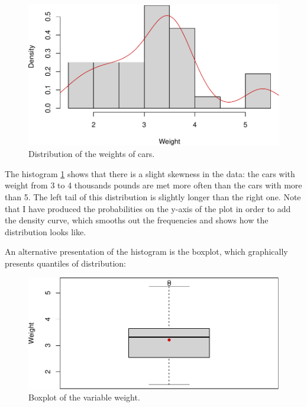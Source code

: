 \documentclass[
]{book}
\newenvironment{Shaded}{\begin{snugshade}}{\end{snugshade}}
\newcommand{\AttributeTok}[1]{\textcolor[rgb]{0.13,0.29,0.53}{#1}}
\newcommand{\DecValTok}[1]{\textcolor[rgb]{0.00,0.00,0.81}{#1}}
\newcommand{\FunctionTok}[1]{\textcolor[rgb]{0.13,0.29,0.53}{\textbf{#1}}}
\newcommand{\NormalTok}[1]{#1}
\newcommand{\SpecialCharTok}[1]{\textcolor[rgb]{0.81,0.36,0.00}{\textbf{#1}}}
\newcommand{\StringTok}[1]{\textcolor[rgb]{0.31,0.60,0.02}{#1}}
\theoremstyle{definition}
\theoremstyle{definition}
\theoremstyle{definition}
\theoremstyle{definition}
\theoremstyle{remark}
\begin{document}
\begin{figure}
\centering
\includegraphics{Svetunkov---Statistics-for-Business-Analytics_files/figure-latex/histWeight-1.pdf}
\caption{\label{fig:histWeight}Distribution of the weights of cars.}
\end{figure}

The histogram \ref{fig:histWeight} shows that there is a slight skewness in the data: the cars with weight from 3 to 4 thousands pounds are met more often than the cars with more than 5. The left tail of this distribution is slightly longer than the right one. Note that I have produced the probabilities on the y-axis of the plot in order to add the density curve, which smooths out the frequencies and shows how the distribution looks like.

An alternative presentation of the histogram is the boxplot, which graphically presents quantiles of distribution:

\begin{Shaded}
\end{Shaded}

\begin{figure}
\centering
\includegraphics{Svetunkov---Statistics-for-Business-Analytics_files/figure-latex/boxWeight-1.pdf}
\caption{\label{fig:boxWeight}Boxplot of the variable weight.}
\end{figure}
\end{document}

